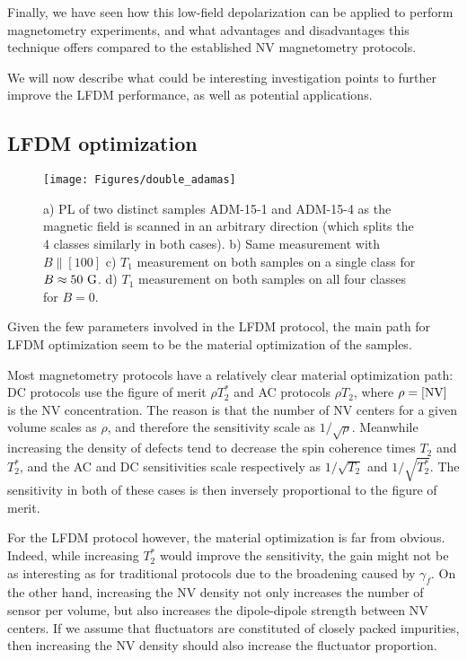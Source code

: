 \documentclass[a4paper,11pt]{report}
\begin{document}
Finally, we have seen how this low-field depolarization can be applied to perform magnetometry experiments, and what advantages and disadvantages this technique offers compared to the established NV magnetometry protocols.

We will now describe what could be interesting investigation points to further improve the LFDM performance, as well as potential applications.

\subsection{LFDM optimization}
\begin{figure}[h!]
\centering
\texttt{[image: Figures/double\_adamas]}
\caption{a) PL of two distinct samples ADM-15-1 and ADM-15-4 as the magnetic field is scanned in an arbitrary direction (which splits the 4 classes similarly in both cases). b) Same measurement with $B\parallel [100]$ c) $T_1$ measurement on both samples on a single class for $B\approx 50\ \rm G$. d) $T_1$ measurement on both samples on all four classes for $B=0$.}
\label{double dragon}
\end{figure}


Given the few parameters involved in the LFDM protocol, the main path for LFDM optimization seem to be the material optimization of the samples.

Most magnetometry protocols have a relatively clear material optimization path: DC protocols use the figure of merit $\rho T_2^*$ and AC protocols $\rho T_2$, where $\rho=[\rm NV]$ is the NV concentration. The reason is that the number of NV centers for a given volume scales as $\rho$, and therefore the sensitivity scale as $1/\sqrt{\rho}$. Meanwhile increasing the density of defects tend to decrease the spin coherence times $T_2$ and $T_2^*$, and the AC and DC sensitivities scale respectively as $1/\sqrt{T_2}$ and $1/\sqrt{T_2^*}$. The sensitivity in both of these cases is then inversely proportional to the figure of merit.

For the LFDM protocol however, the material optimization is far from obvious. Indeed, while increasing $T_2^*$ would improve the sensitivity, the gain might not be as interesting as for traditional protocols due to the broadening caused by $\gamma_f$. On the other hand, increasing the NV density not only increases the number of sensor per volume, but also increases the dipole-dipole strength between NV centers. If we assume that fluctuators are constituted of closely packed impurities, then increasing the NV density should also increase the fluctuator proportion.
\end{document}
